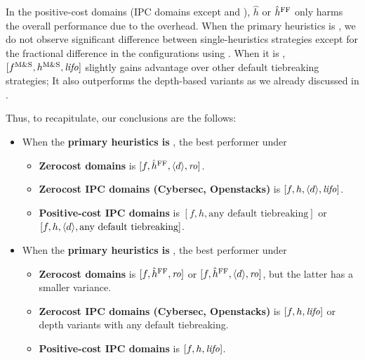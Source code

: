 In the positive-cost domains (IPC domains except  and ), $\hat{h}$ or $\hat{h}^{\text{FF}}$
only harms the overall performance due to the overhead.
When the primary heuristics is \lmcut, we do not observe significant difference between single-heuristics strategies except for the fractional difference in the configurations using \ro.
When it is \mands, $[f^\text{M\&S},h^\text{M\&S},{\text{\textit{lifo}}}]$ slightly gains advantage over other default tiebreaking strategies; It also outperforms the depth-based variants as we already discussed in .

\pagebreak[3]

Thus, to recapitulate, our conclusions are the follows:
\begin{itemize}
 \item When the \textbf{primary heuristics is \lmcut}, the best performer under
       \begin{itemize}
        \item \textbf{Zerocost domains} is $[f,\hat{h}^{\text{FF}},{\left<d\right>},{\text{\textit{ro}}}]$.
        \item \textbf{Zerocost IPC domains (Cybersec, Openstacks)} is $[f,h,{\left<d\right>},{\text{\textit{lifo}}}]$.
        \item \textbf{Positive-cost IPC domains} is $[f,h, \text{any default tiebreaking}]$ or $[f,h, {\left<d\right>}, \text{any default tiebreaking}]$.
       \end{itemize}
 \item When the \textbf{primary heuristics is \mands}, the best performer under
       \begin{itemize}
        \item \textbf{Zerocost domains} is $[f,\hat{h}^{\text{FF}},{\text{\textit{ro}}}]$ or $[f,\hat{h}^{\text{FF}},{\left<d\right>},{\text{\textit{ro}}}]$, but the latter has
              a smaller variance.
        \item \textbf{Zerocost IPC domains (Cybersec, Openstacks)} is $[f,h,{\text{\textit{lifo}}}]$ or depth variants with any default tiebreaking.
        \item \textbf{Positive-cost IPC domains} is $[f,h,{\text{\textit{lifo}}}]$.
       \end{itemize}
\end{itemize}

